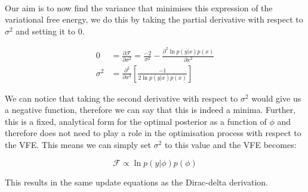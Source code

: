 \documentclass{article}
\begin{document}
\

Our aim is to now find the variance that minimises this expression of the variational free energy, we do this by taking the partial derivative with respect to $\sigma^2$ and setting it to 0.

\begin{equation}
\begin{aligned}
	0 &= \frac{\partial \mathcal{F}}{\partial \sigma^2}	= \frac{-2}{\sigma^2} - \frac{\partial^2 \ln p(y | x) p(x)}{\partial x^2} \\
	\sigma^2 &= \frac{\partial^2}{\partial x^2} \left[ \frac{-1}{2\ln p(y | x) p(x) } \right]
\end{aligned}
\end{equation}

We can notice that taking the second derivative with respect to $\sigma^2$ would give us a negative function, therefore we can say that this is indeed a minima. Further, this is a fixed, analytical form for the optimal posterior as a function of $\phi$ and therefore does not need to play a role in the optimisation process with respect to the VFE. This means we can simply set $\sigma^2$ to this value and the VFE becomes:

\begin{equation}
	\mathcal{F} \propto \ln p(y | \phi) p(\phi)
\end{equation}

This results in the same update equations as the Dirac-delta derivation. 
\end{document}
